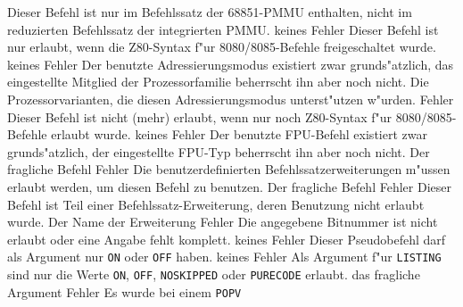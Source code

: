 \documentclass[12pt,a4paper,twoside]{report}
\newcommand{\tty}[1]{{\tt #1}}
\begin{document}
\begin{description}
               {Dieser Befehl ist nur im Befehlssatz der 
                68851-PMMU enthalten, nicht im reduzierten
                Befehlssatz der integrierten PMMU.}
               {keines}
               {Fehler}
               {Dieser Befehl ist nur erlaubt, wenn die
                Z80-Syntax f"ur 8080/8085-Befehle freigeschaltet
                wurde.}
               {keines}
               {Fehler}
               {Der benutzte Adressierungsmodus existiert
                zwar grunds"atzlich, das eingestellte Mitglied der
                Prozessorfamilie beherrscht ihn aber noch nicht.}
               {Die Prozessorvarianten, die diesen
                Adressierungsmodus unterst"utzen w"urden.}
               {Fehler}
               {Dieser Befehl ist nicht (mehr) erlaubt, wenn nur
                noch Z80-Syntax f"ur 8080/8085-Befehle erlaubt
                wurde.}
               {keines}
               {Fehler}
               {Der benutzte FPU-Befehl existiert zwar
                grunds"atzlich, der eingestellte FPU-Typ
                beherrscht ihn aber noch nicht.}
               {Der fragliche Befehl}
               {Fehler}
               {Die benutzerdefinierten Befehlssatzerweiterungen
                m"ussen erlaubt werden, um diesen Befehl zu benutzen.}
               {Der fragliche Befehl}
               {Fehler}
               {Dieser Befehl ist Teil einer Befehlssatz-Erweiterung,
                deren Benutzung nicht erlaubt wurde.}
               {Der Name der Erweiterung}
               {Fehler}
               {Die angegebene Bitnummer ist nicht erlaubt
	        oder eine Angabe fehlt komplett.}
               {keines}
               {Fehler}
               {Dieser Pseudobefehl darf als Argument nur \tty{ON}
                oder \tty{OFF} haben.}
               {keines}
               {Fehler}
               {Als Argument f"ur \tty{LISTING} sind nur die Werte
                \tty{ON}, \tty{OFF}, \tty{NOSKIPPED} oder \tty{PURECODE}
                erlaubt.}
               {das fragliche Argument}
               {Fehler}
               {Es wurde bei einem \tty{POPV}
}
\end{description}
\end{document}
